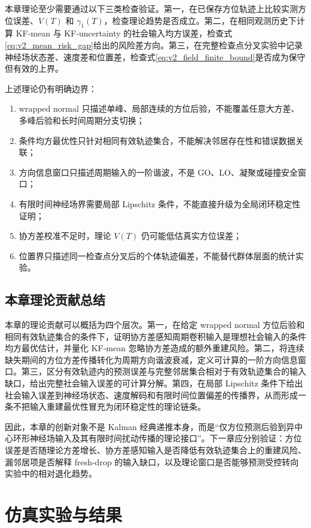 \documentclass[UTF8,fontset=windows,11pt]{ctexart}
\begin{document}
本章理论至少需要通过以下三类检查验证。第一，在已保存方位轨迹上比较实测方位误差、$V(T)$ 和 $\gamma_1(T)$，检查理论趋势是否成立。第二，在相同观测历史下计算 KF-mean 与 KF-uncertainty 的社会输入均方误差，检查式\eqref{eq:v2_mean_risk_gap}给出的风险差方向。第三，在完整检查点分叉实验中记录神经场状态差、速度差和位置差，检查式\eqref{eq:v2_field_finite_bound}是否成为保守但有效的上界。

上述理论仍有明确边界：
\begin{enumerate}
 \item wrapped normal 只描述单峰、局部连续的方位后验，不能覆盖任意大方差、多峰后验和长时间周期分支切换；
 \item 条件均方最优性只针对相同有效轨迹集合，不能解决邻居存在性和错误数据关联；
 \item 方向信息窗口只描述周期输入的一阶谐波，不是 GO、LO、凝聚或碰撞安全窗口；
 \item 有限时间神经场界需要局部 Lipschitz 条件，不能直接升级为全局闭环稳定性证明；
 \item 协方差校准不足时，理论 $V(T)$ 仍可能低估真实方位误差；
 \item 位置界只描述同一检查点分叉后的个体轨迹偏差，不能替代群体层面的统计实验。
\end{enumerate}

\subsection{本章理论贡献总结}

本章的理论贡献可以概括为四个层次。第一，在给定 wrapped normal 方位后验和相同有效轨迹集合的条件下，证明协方差感知周期卷积输入是理想社会输入的条件均方最优估计，并量化 KF-mean 忽略协方差造成的额外重建风险。第二，将连续缺失期间的方位方差传播转化为周期方向谐波衰减，定义可计算的一阶方向信息窗口。第三，区分有效轨迹内的预测误差与完整邻居集合相对于有效轨迹集合的输入缺口，给出完整社会输入误差的可计算分解。第四，在局部 Lipschitz 条件下给出社会输入误差到神经场状态、速度解码和有限时间位置偏差的传播界，从而形成一条不把输入重建最优性冒充为闭环稳定性的理论链条。

因此，本章的创新对象不是 Kalman 经典递推本身，而是“仅方位预测后验到异中心环形神经场输入及其有限时间扰动传播的理论接口”。下一章应分别验证：方位误差是否随理论方差增长、协方差感知输入是否降低有效轨迹集合上的重建风险、漏邻居项是否解释 fresh-drop 的输入缺口，以及理论窗口是否能够预测受控转向实验中的相对退化趋势。

\section{仿真实验与结果}
\end{document}
